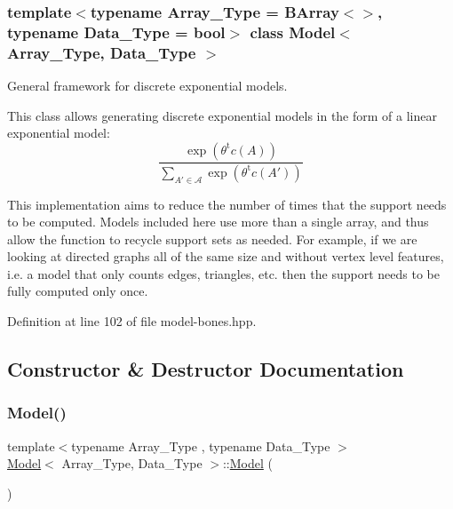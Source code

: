 \subsubsection*{template$<$typename Array\+\_\+\+Type = B\+Array$<$$>$, typename Data\+\_\+\+Type = bool$>$\newline
class Model$<$ Array\+\_\+\+Type, Data\+\_\+\+Type $>$}

General framework for discrete exponential models. 

This class allows generating discrete exponential models in the form of a linear exponential model\+: \[ \frac{ \exp{\left(\theta^{\mbox{t}}c(A)\right)} }{ \sum_{A'\in \mathcal{A}}\exp{\left(\theta^{\mbox{t}}c(A')\right)} } \]

This implementation aims to reduce the number of times that the support needs to be computed. Models included here use more than a single array, and thus allow the function to recycle support sets as needed. For example, if we are looking at directed graphs all of the same size and without vertex level features, i.\+e. a model that only counts edges, triangles, etc. then the support needs to be fully computed only once. 

Definition at line 102 of file model-\/bones.\+hpp.



\subsection{Constructor \& Destructor Documentation}
\mbox{\label{class_model_a38122122aa4eb799b90ed1ee49b9410c}} 
\subsubsection{\texorpdfstring{Model()}{Model()}\hspace{0.1cm}{\footnotesize\ttfamily [1/2]}}
{\footnotesize\ttfamily template$<$typename Array\+\_\+\+Type , typename Data\+\_\+\+Type $>$ \\
\hyperlink{class_model}{Model}$<$ Array\+\_\+\+Type, Data\+\_\+\+Type $>$\+::\hyperlink{class_model}{Model} (\begin{DoxyParamCaption}{ }\end{DoxyParamCaption})\hspace{0.3cm}{\ttfamily [inline]}}



